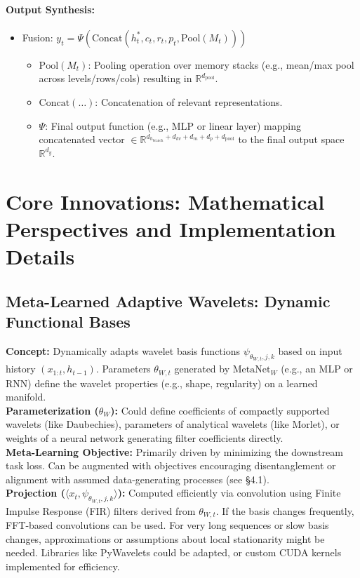 \documentclass{article}
\begin{document}
\paragraph{Output Synthesis:}
\begin{itemize}
    \item Fusion: $y_t = \Psi(\text{Concat}(h^*_t, c_t, r_t, p_t, \text{Pool}(M_t)))$
        \begin{itemize}
        \item $\text{Pool}(M_t)$: Pooling operation over memory stacks (e.g., mean/max pool across levels/rows/cols) resulting in $\mathbb{R}^{d_{\text{pool}}}$.
        \item $\text{Concat}(\dots)$: Concatenation of relevant representations. %
        \item $\Psi$: Final output function (e.g., MLP or linear layer) mapping concatenated vector $\in \mathbb{R}^{d_{h_{\text{branch}}} + d_{kv} + d_m + d_p + d_{\text{pool}}}$ to the final output space $\mathbb{R}^{d_y}$.
        \end{itemize}
\end{itemize}

\section{Core Innovations: Mathematical Perspectives and Implementation Details}

\subsection{Meta-Learned Adaptive Wavelets: Dynamic Functional Bases}
\textbf{Concept:} Dynamically adapts wavelet basis functions $\psi_{\theta_{W,t},j,k}$ based on input history $(x_{1:t}, h_{t-1})$. Parameters $\theta_{W,t}$ generated by $\text{MetaNet}_W$ (e.g., an MLP or RNN) define the wavelet properties (e.g., shape, regularity) on a learned manifold. \\
\textbf{Parameterization ($\theta_W$):} Could define coefficients of compactly supported wavelets (like Daubechies), parameters of analytical wavelets (like Morlet), or weights of a neural network generating filter coefficients directly. \\
\textbf{Meta-Learning Objective:} Primarily driven by minimizing the downstream task loss. Can be augmented with objectives encouraging disentanglement or alignment with assumed data-generating processes (see \S4.1). \\
\textbf{Projection ($\langle x_t, \psi_{\theta_{W,t},j,k} \rangle$):} Computed efficiently via convolution using Finite Impulse Response (FIR) filters derived from $\theta_{W,t}$. If the basis changes frequently, FFT-based convolutions can be used. For very long sequences or slow basis changes, approximations or assumptions about local stationarity might be needed. Libraries like PyWavelets could be adapted, or custom CUDA kernels implemented for efficiency.
\end{document}
